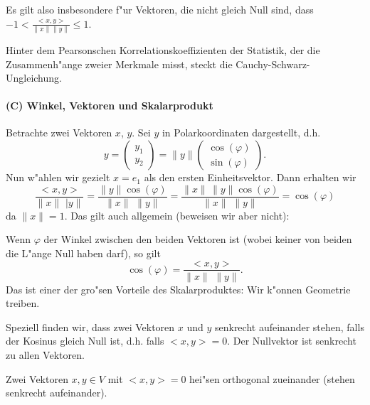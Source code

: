 Es gilt also insbesondere f"ur Vektoren, die nicht gleich Null sind, dass 
$ -1 < \frac{<x,y>}{\|x\|\|y\|}\leq 1$.

 Hinter dem Pearsonschen  Korrelationskoeffizienten der Statistik, 
der die Zusammenh"ange zweier Merkmale misst, steckt die Cauchy-Schwarz-Ungleichung.
\paragraph{(C) Winkel, Vektoren und Skalarprodukt }
Betrachte zwei Vektoren $x$, $y$. Sei $y$ in Polarkoordinaten dargestellt, d.h.
$$y 
= \left(\begin{array}{c} y_1 \\ y_2\end{array}\right)
= \|y\|  \left(\begin{array}{c} \cos(\varphi) \\ \sin(\varphi)\end{array}\right).
 $$ 
Nun w"ahlen wir gezielt $x=e_1$ als den ersten Einheitsvektor. 
Dann erhalten wir
$$ \frac{<x,y>}{\|x\|\,\,|y\|} 
= \frac{\|y\|\cos(\varphi)}{\|x\|\,\,\|y\|} 
= \frac{\|x\|\,\|y\|\cos(\varphi)}{\|x\|\,\,\|y\|} 
= \cos(\varphi)$$
da $\|x\|=1$. Das gilt auch allgemein (beweisen wir aber nicht):
\begin{sbem} Wenn $\varphi$ der Winkel zwischen den beiden Vektoren ist 
(wobei keiner von beiden die L"ange Null haben darf), so 
gilt
$$ \cos(\varphi) = \frac{<x,y>}{\|x\|\,\,\|y\|}.$$
Das ist einer der gro"sen Vorteile des Skalarproduktes: Wir k"onnen Geometrie 
treiben.\end{sbem}

Speziell finden wir, dass zwei Vektoren $x$ und $y$ senkrecht aufeinander stehen, 
falls der Kosinus gleich Null ist, d.h. falls $ <x,y> = 0.$
Der Nullvektor ist senkrecht zu allen Vektoren.

\begin{sdefi} Zwei Vektoren $x,y\in V$ mit $<x,y>=0$ hei"sen orthogonal zueinander 
(stehen senkrecht aufeinander). 
\end{sdefi}
\begin{auf}\cha\label{block1A3}

\end{auf}
\begin{auf}\cha\label{block1A4}

\end{auf}
\begin{auf}\chc\label{block1A5a}

\end{auf}

